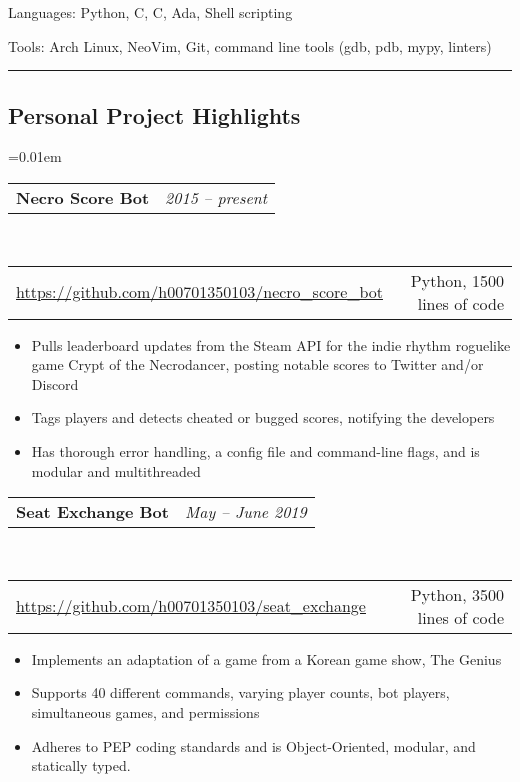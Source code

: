 \documentclass[10pt,letterpaper]{article}
\makeatletter
\newenvironment{indentsection}[1]%
{\begin{list}{}%
	{\setlength{\leftmargin}{#1}}%
	\item[]%
}
{\end{list}}
\newcommand{\headerrow}[2]
{\begin{tabular*}{\linewidth}{l@{\extracolsep{\fill}}r}
	#1 &
	#2 \\
\end{tabular*}}
\newcommand{\CPP}
{C\nolinebreak[4]\hspace{-.05em}\raisebox{.22ex}{\footnotesize\bf ++}}
\makeatother
\begin{document}
\begin{indentsection}{\parindent}
\begin{description*}
    \item[Languages:]
        Python, \CPP, C, Ada, Shell scripting
    \item[Tools:]
        Arch Linux, NeoVim, Git, command line tools (gdb, pdb, mypy, linters)
\end{description*}
\end{indentsection}

\hrule
\vspace{-0.4em}
\subsection*{Personal Project Highlights}

\parskip=0.01em

\headerrow
    {\textbf{Necro Score Bot}}
    {\emph{2015 -- present}}
\\
\headerrow
    {\url{https://github.com/h00701350103/necro\_score\_bot}}
    {Python, 1500 lines of code}
\begin{itemize}[noitemsep, topsep=0pt]
    \item Pulls leaderboard updates from the Steam API for the indie rhythm
        roguelike game Crypt of the Necrodancer, posting notable scores to
        Twitter and/or Discord
    \item Tags players and detects cheated or bugged scores, notifying the
        developers
    \item Has thorough error handling, a config file and command-line
        flags, and is modular and multithreaded
\end{itemize}

\vspace{0.5em}
\headerrow
    {\textbf{Seat Exchange Bot}}
    {\emph{May -- June 2019}}
\\
\headerrow
    {\url{https://github.com/h00701350103/seat\_exchange}}
    {Python, 3500 lines of code}
\begin{itemize}[noitemsep, topsep=0pt]
    \item Implements an adaptation of a game from a Korean game show, The
        Genius
    \item Supports 40 different commands, varying player counts,
        bot players, simultaneous games, and permissions
    \item Adheres to PEP coding standards and is Object-Oriented, modular,
        and statically typed.
\end{itemize}
\end{document}
